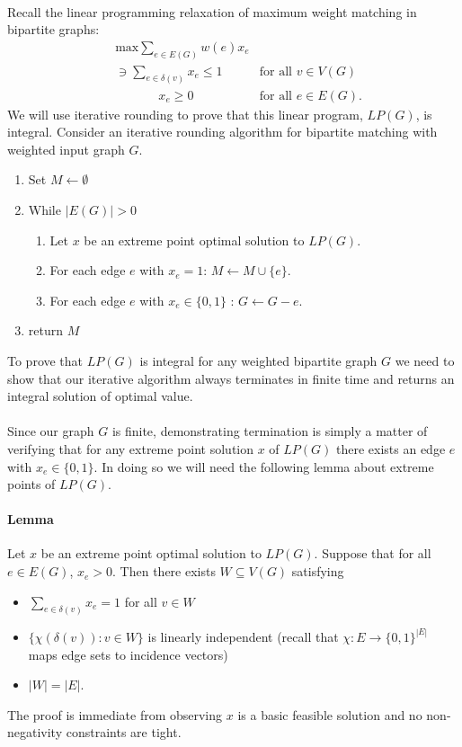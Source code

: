 \paragraph{}
Recall the linear programming relaxation of maximum weight matching in bipartite graphs:
\begin{align*}
	&\text{max} \sum_{e \in E(G)} w(e) x_e \\
	&\ni \sum_{e \in \delta(v)} x_e \leq 1 &\text{for all $v \in V(G)$} \\
	&\quad\quad\quad\ \ x_e \geq 0 &\text{for all $e \in E(G)$.}
\end{align*}
We will use iterative rounding to prove that this linear program, $LP(G)$, is integral. Consider an iterative rounding algorithm for bipartite matching with weighted input graph $G$.
\begin{enumerate}
\item Set $M \leftarrow \emptyset$
\item While $|E(G)| > 0$\begin{enumerate}
\item Let $x$ be an extreme point optimal solution to $LP(G)$.
\item For each edge $e$ with $x_e = 1$: $M \leftarrow M \cup \{e\}$.
\item For each edge $e$ with $x_e \in \{0,1\}$ : $G \leftarrow G - e$.
\end{enumerate}
\item return $M$
\end{enumerate}
To prove that $LP(G)$ is integral for any weighted bipartite graph $G$ we need to show that our iterative algorithm always terminates in finite time and returns an integral solution of optimal value.
\paragraph{} Since our graph $G$ is finite, demonstrating termination is simply a matter of verifying that for any extreme point solution $x$ of $LP(G)$ there exists an edge $e$ with $x_e \in \{0,1\}$. In doing so we will need the following lemma about extreme points of $LP(G)$.
\paragraph{Lemma} Let $x$ be an extreme point optimal solution to $LP(G)$. Suppose that for all $e \in E(G)$, $x_e > 0$. Then there exists $W \subseteq V(G)$ satisfying
\begin{itemize}
\item $\sum_{e\in\delta(v)} x_e = 1$ for all $v \in W$ \\
\item $\{\chi(\delta(v)) : v \in W\}$ is linearly independent (recall that $\chi : E \rightarrow \{0,1\}^{|E|}$ maps edge sets to incidence vectors)
\item $|W| = |E|$.
\end{itemize} 
The proof is immediate from observing $x$ is a basic feasible solution and no non-negativity constraints are tight.
